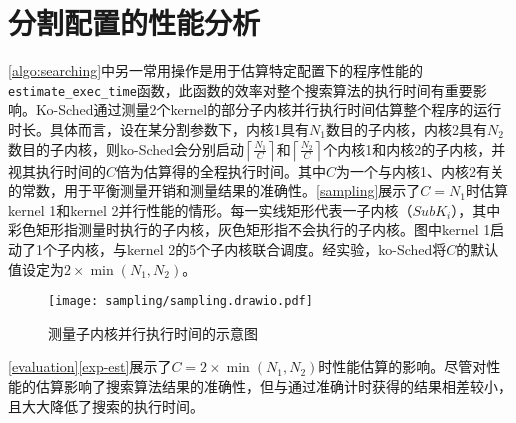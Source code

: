 \section{分割配置的性能分析}\label{sec:profile}

\autoref{algo:searching}中另一常用操作是用于估算特定配置下的程序性能的\texttt{estimate\_exec\_time}函数，此函数的效率对整个搜索算法的执行时间有重要影响。Ko-Sched通过测量2个kernel的部分子内核并行执行时间估算整个程序的运行时长。具体而言，设在某分割参数下，内核1具有$N_1$数目的子内核，内核2具有$N_2$数目的子内核，则ko-Sched会分别启动$\left\lceil \frac{N_1}{C}\right\rceil $和$\left\lceil \frac{N_2}{C}\right\rceil $个内核1和内核2的子内核，并视其执行时间的$C$倍为估算得的全程执行时间。其中$C$为一个与内核1、内核2有关的常数，用于平衡测量开销和测量结果的准确性。\autoref{sampling}展示了$C=N_1$时估算kernel 1和kernel 2并行性能的情形。每一实线矩形代表一子内核（$SubK_{i}$），其中彩色矩形指测量时执行的子内核，灰色矩形指不会执行的子内核。图中kernel 1启动了1个子内核，与kernel 2的5个子内核联合调度。经实验，ko-Sched将$C$的默认值设定为$2 \times \min \left(N_1, N_2\right)$。

\begin{figure}[htbp]
    \centering
    \texttt{[image: sampling/sampling.drawio.pdf]}
    \caption{测量子内核并行执行时间的示意图}
    \label{sampling}
\end{figure}

\autoref{evaluation}\autoref{exp-est}展示了$C=2 \times \min \left(N_1, N_2\right)$时性能估算的影响。尽管对性能的估算影响了搜索算法结果的准确性，但与通过准确计时获得的结果相差较小，且大大降低了搜索的执行时间。